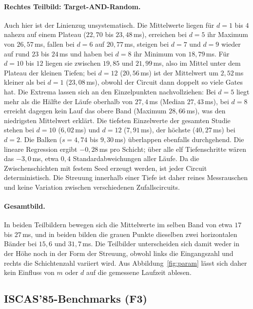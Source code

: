 \documentclass[a4paper,12pt]{article}
\theoremstyle{definition}
\begin{document}
\paragraph{Rechtes Teilbild: Target-AND-Random.} Auch hier ist der Linienzug unsystematisch. Die Mittelwerte liegen für $d = 1$ bis $4$ nahezu auf einem Plateau ($22{,}70$ bis $23{,}48$\,ms), erreichen bei $d = 5$ ihr Maximum von $26{,}57$\,ms, fallen bei $d = 6$ auf $20{,}77$\,ms, steigen bei $d = 7$ und $d = 9$ wieder auf rund $23$ bis $24$\,ms und haben bei $d = 8$ ihr Minimum von $18{,}79$\,ms. Für $d = 10$ bis $12$ liegen sie zwischen $19{,}85$ und $21{,}99$\,ms, also im Mittel unter dem Plateau der kleinen Tiefen; bei $d = 12$ ($20{,}56$\,ms) ist der Mittelwert um $2{,}52$\,ms kleiner als bei $d = 1$ ($23{,}08$\,ms), obwohl der Circuit dann doppelt so viele Gates hat. Die Extrema lassen sich an den Einzelpunkten nachvollziehen: Bei $d = 5$ liegt mehr als die Hälfte der Läufe oberhalb von $27{,}4$\,ms (Median $27{,}43$\,ms), bei $d = 8$ erreicht dagegen kein Lauf das obere Band (Maximum $28{,}66$\,ms), was den niedrigsten Mittelwert erklärt. Die tiefsten Einzelwerte der gesamten Studie stehen bei $d = 10$ ($6{,}02$\,ms) und $d = 12$ ($7{,}91$\,ms), der höchste ($40{,}27$\,ms) bei $d = 2$. Die Balken ($s = 4{,}74$ bis $9{,}30$\,ms) überlappen ebenfalls durchgehend. Die lineare Regression ergibt $-0{,}28$\,ms pro Schicht; über alle elf Tiefenschritte wären das $-3{,}0$\,ms, etwa $0{,}4$ Standardabweichungen aller Läufe. Da die Zwischenschichten mit festem Seed erzeugt werden, ist jeder Circuit deterministisch. Die Streuung innerhalb einer Tiefe ist daher reines Messrauschen und keine Variation zwischen verschiedenen Zufallscircuits.

\paragraph{Gesamtbild.} In beiden Teilbildern bewegen sich die Mittelwerte im selben Band von etwa $17$ bis $27$\,ms, und in beiden bilden die grauen Punkte dieselben zwei horizontalen Bänder bei $15{,}6$ und $31{,}7$\,ms. Die Teilbilder unterscheiden sich damit weder in der Höhe noch in der Form der Streuung, obwohl links die Eingangszahl und rechts die Schichtenzahl variiert wird. Aus Abbildung~\ref{fig:param} lässt sich daher kein Einfluss von $m$ oder $d$ auf die gemessene Laufzeit ablesen.

\subsection{ISCAS'85-Benchmarks (F3)}
\end{document}
